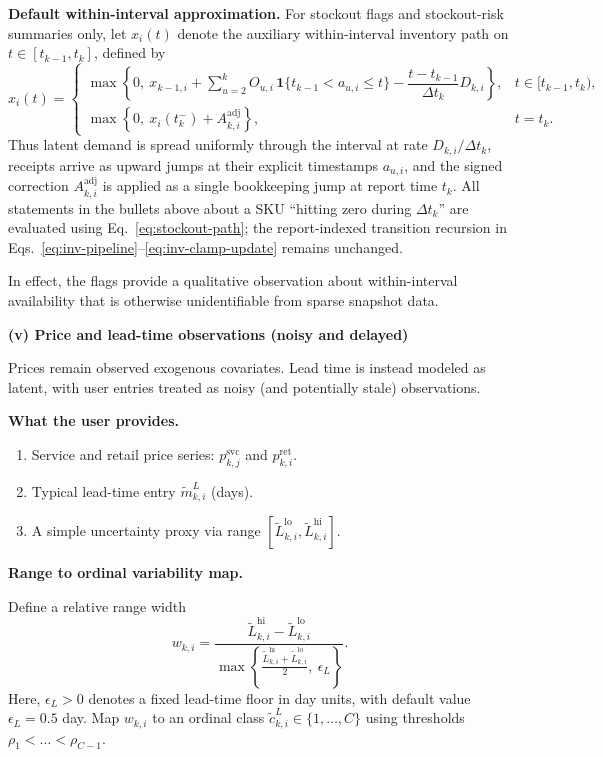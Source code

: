 \documentclass[11pt]{article}
\begin{document}
\textbf{Default within-interval approximation.}
For stockout flags and stockout-risk summaries only, let $x_i(t)$ denote the auxiliary within-interval inventory path on $t\in[t_{k-1},t_k]$, defined by
\begin{equation}\label{eq:stockout-path}
  x_i(t)=
  \begin{cases}
    \max\!\left\{0,\ x_{k-1,i}+\sum_{u=2}^{k} O_{u,i}\,\mathbf{1}\{t_{k-1}<a_{u,i}\le t\}-\dfrac{t-t_{k-1}}{\Delta t_k}D_{k,i}\right\}, & t\in[t_{k-1},t_k),\\
    \max\!\left\{0,\ x_i(t_k^-)+A^{\mathrm{adj}}_{k,i}\right\}, & t=t_k.
  \end{cases}
\end{equation}
Thus latent demand is spread uniformly through the interval at rate $D_{k,i}/\Delta t_k$, receipts arrive as upward jumps at their explicit timestamps $a_{u,i}$, and the signed correction $A^{\mathrm{adj}}_{k,i}$ is applied as a single bookkeeping jump at report time $t_k$.
All statements in the bullets above about a SKU ``hitting zero during $\Delta t_k$'' are evaluated using Eq.~\eqref{eq:stockout-path}; the report-indexed transition recursion in Eqs.~\eqref{eq:inv-pipeline}--\eqref{eq:inv-clamp-update} remains unchanged.

In effect, the flags provide a qualitative observation about within-interval availability that is otherwise unidentifiable from sparse snapshot data.

\textbf{(v) Price and lead-time observations (noisy and delayed)}

Prices remain observed exogenous covariates. Lead time is instead modeled as latent, with user entries treated as noisy (and potentially stale) observations.

\textbf{What the user provides.}
\begin{enumerate}
  \item Service and retail price series: $p^{\mathrm{svc}}_{k,j}$ and $p^{\mathrm{ret}}_{k,i}$.
  \item Typical lead-time entry $\tilde m^L_{k,i}$ (days).
  \item A simple uncertainty proxy via range $[\tilde L^{\mathrm{lo}}_{k,i},\tilde L^{\mathrm{hi}}_{k,i}]$.
\end{enumerate}

\textbf{Range to ordinal variability map.}

Define a relative range width
\[
  w_{k,i}=\frac{\tilde L^{\mathrm{hi}}_{k,i}-\tilde L^{\mathrm{lo}}_{k,i}}{\max\!\left\{\frac{\tilde L^{\mathrm{hi}}_{k,i}+\tilde L^{\mathrm{lo}}_{k,i}}{2},\ \epsilon_L\right\}}.
\]
Here, $\epsilon_L>0$ denotes a fixed lead-time floor in day units, with default value $\epsilon_L=0.5$ day.
Map $w_{k,i}$ to an ordinal class $\tilde c^L_{k,i}\in\{1,\dots,C\}$ using thresholds $\rho_1<\dots<\rho_{C-1}$.
\end{document}
